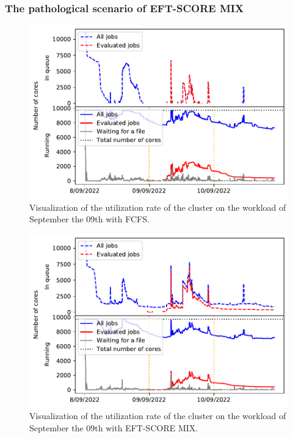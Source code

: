 \documentclass[conference,10pt]{IEEEtran}
\begin{document}
\subsubsection{The pathological scenario of EFT-SCORE MIX}

\begin{figure}[H]\centering\includegraphics[scale=0.47]{../MBSS/plot/Cluster_usage/2022-09-09->2022-09-09_V10000_Fcfs_Used_nodes_Reduced_450_128_32_256_4_1024_core_by_core.pdf}\caption{Visualization of the utilization rate of the cluster on the workload of September the 09th with FCFS.}\end{figure}
\begin{figure}[H]\centering\includegraphics[scale=0.47]{../MBSS/plot/Cluster_usage/2022-09-09->2022-09-09_V10000_Fcfs_with_a_score_mixed_strategy_x500_x1_x0_x0_Used_nodes_Reduced_450_128_32_256_4_1024_core_by_core.pdf}\caption{Visualization of the utilization rate of the cluster on the workload of September the 09th with EFT-SCORE MIX.}\end{figure}
\end{document}
